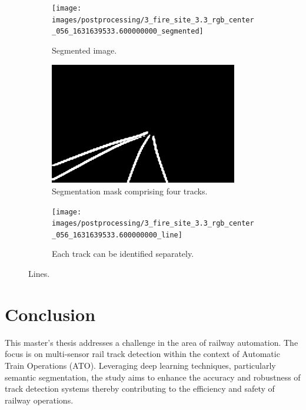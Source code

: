 \documentclass[Master,MDS,english]{BASE/twbook} %
\begin{document}
\begin{figure}
\centering
\begin{subfigure}[t]{.33\textwidth}
  \centering
  \texttt{[image: images/postprocessing/3\_fire\_site\_3.3\_rgb\_center\_056\_1631639533.600000000\_segmented]}
  \caption{Segmented image.}
\end{subfigure}%
\begin{subfigure}[t]{.33\textwidth}
  \centering
  \includegraphics[width=0.9\textwidth]{images/postprocessing/3_fire_site_3.3_rgb_center_056_1631639533.600000000_mask}
  \caption{Segmentation mask comprising four tracks.}
\end{subfigure}%
\begin{subfigure}[t]{.33\textwidth}
  \centering
  \texttt{[image: images/postprocessing/3\_fire\_site\_3.3\_rgb\_center\_056\_1631639533.600000000\_line]}
  \caption{Each track can be identified separately. }
\end{subfigure}
\caption{Lines. }
\label{fig:postprocessing1}
\end{figure}




\chapter{Conclusion} %

This master's thesis addresses a challenge in the area of railway automation. The focus is on multi-sensor rail track detection within the context of Automatic Train Operations (ATO). Leveraging deep learning techniques, particularly semantic segmentation, the study aims to enhance the accuracy and robustness of track detection systems thereby contributing to the efficiency and safety of railway operations.
\end{document}
